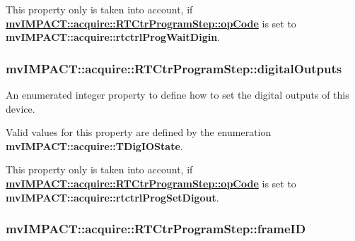 This property only is taken into account, if {\bfseries \hyperlink{classmv_i_m_p_a_c_t_1_1acquire_1_1_r_t_ctr_program_step_a823c9cad26ad628155d68130ad1d6d5d}{mv\+I\+M\+P\+A\+C\+T\+::acquire\+::\+R\+T\+Ctr\+Program\+Step\+::op\+Code}} is set to {\bfseries mv\+I\+M\+P\+A\+C\+T\+::acquire\+::rtctrl\+Prog\+Wait\+Digin}. \hypertarget{classmv_i_m_p_a_c_t_1_1acquire_1_1_r_t_ctr_program_step_a9ccd96117b14e3031c38a59f6cf6595c}{
\subsubsection[{digital\+Outputs}]{ mv\+I\+M\+P\+A\+C\+T\+::acquire\+::\+R\+T\+Ctr\+Program\+Step\+::digital\+Outputs}}\label{classmv_i_m_p_a_c_t_1_1acquire_1_1_r_t_ctr_program_step_a9ccd96117b14e3031c38a59f6cf6595c}


An enumerated integer property to define how to set the digital outputs of this device. 

Valid values for this property are defined by the enumeration {\bfseries mv\+I\+M\+P\+A\+C\+T\+::acquire\+::\+T\+Dig\+I\+O\+State}.

This property only is taken into account, if {\bfseries \hyperlink{classmv_i_m_p_a_c_t_1_1acquire_1_1_r_t_ctr_program_step_a823c9cad26ad628155d68130ad1d6d5d}{mv\+I\+M\+P\+A\+C\+T\+::acquire\+::\+R\+T\+Ctr\+Program\+Step\+::op\+Code}} is set to {\bfseries mv\+I\+M\+P\+A\+C\+T\+::acquire\+::rtctrl\+Prog\+Set\+Digout}. \hypertarget{classmv_i_m_p_a_c_t_1_1acquire_1_1_r_t_ctr_program_step_acaad4a76b9a9805234c1a8a1a7aa0aa3}{
\subsubsection[{frame\+I\+D}]{ mv\+I\+M\+P\+A\+C\+T\+::acquire\+::\+R\+T\+Ctr\+Program\+Step\+::frame\+I\+D}}\label{classmv_i_m_p_a_c_t_1_1acquire_1_1_r_t_ctr_program_step_acaad4a76b9a9805234c1a8a1a7aa0aa3}


